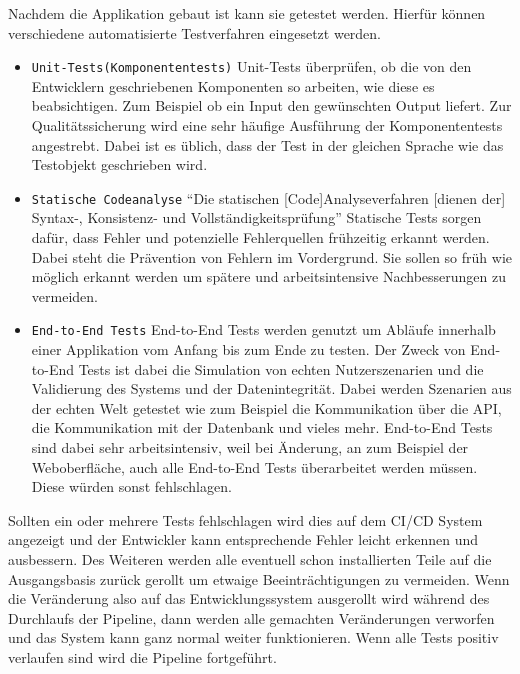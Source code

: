 Nachdem die Applikation gebaut ist kann sie getestet werden. Hierfür können verschiedene automatisierte Testverfahren eingesetzt werden.
\begin{itemize}
	\item \texttt{Unit-Tests(Komponententests)} Unit-Tests überprüfen, ob die von den Entwicklern geschriebenen Komponenten so arbeiten, wie diese es beabsichtigen. Zum Beispiel ob ein Input den gewünschten Output liefert.\autocite[Vgl.][S.21]{Westphal.2012} Zur Qualitätssicherung wird eine sehr häufige Ausführung der Komponententests angestrebt. Dabei ist es üblich, dass der Test in der gleichen Sprache wie das Testobjekt geschrieben wird.
	\item  \texttt{Statische Codeanalyse} \enquote{Die statischen [Code]Analyseverfahren [dienen der] Syntax-, Konsistenz- und Vollständigkeitsprüfung}\autocite[S.264]{Bommer.2008} Statische Tests sorgen dafür, dass Fehler und potenzielle Fehlerquellen frühzeitig erkannt werden. Dabei steht die Prävention von Fehlern im Vordergrund. Sie sollen so früh wie möglich erkannt werden um spätere und arbeitsintensive Nachbesserungen zu vermeiden.\autocite[Vgl.][S.263]{Bommer.2008}
	\item  \texttt{End-to-End Tests} End-to-End Tests werden genutzt um Abläufe innerhalb einer Applikation vom Anfang bis zum Ende zu testen. Der Zweck von End-to-End Tests ist dabei die Simulation von echten Nutzerszenarien und die Validierung des Systems und der Datenintegrität.\autocite[Vgl.][S.250]{Bommer.2008} Dabei werden Szenarien aus der echten Welt getestet wie zum Beispiel die Kommunikation über die API, die Kommunikation mit der Datenbank und vieles mehr. End-to-End Tests sind dabei sehr arbeitsintensiv, weil bei Änderung, an zum Beispiel der Weboberfläche, auch alle End-to-End Tests überarbeitet werden müssen. Diese würden sonst fehlschlagen.\autocite[Vgl.][S.252]{Bommer.2008}
\end{itemize}
 Sollten ein oder mehrere Tests fehlschlagen wird dies auf dem CI/CD System angezeigt und der Entwickler kann entsprechende Fehler leicht erkennen und ausbessern. Des Weiteren werden alle eventuell schon installierten Teile auf die Ausgangsbasis zurück gerollt um etwaige Beeinträchtigungen zu vermeiden. Wenn die Veränderung also auf das Entwicklungssystem ausgerollt wird während des Durchlaufs der Pipeline, dann werden alle gemachten Veränderungen verworfen und das System kann ganz normal weiter funktionieren.\autocite[Vgl.][S.41]{Farley.2010} Wenn alle Tests positiv verlaufen sind wird die Pipeline fortgeführt.\\
